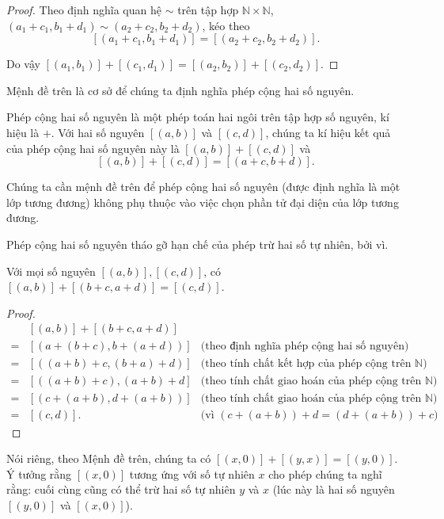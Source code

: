\begin{proof}
    Theo định nghĩa quan hệ $\sim$ trên tập hợp $\mathbb{N}\times\mathbb{N}$, $(a_{1}+c_{1}, b_{1}+d_{1}) \sim (a_{2}+c_{2}, b_{2}+d_{2})$, kéo theo
    \[
        [(a_{1}+c_{1}, b_{1}+d_{1})] = [(a_{2}+c_{2}, b_{2}+d_{2})].
    \]

    Do vậy $[(a_{1}, b_{1})] + [(c_{1}, d_{1})] = [(a_{2}, b_{2})] + [(c_{2}, d_{2})]$.
\end{proof}

Mệnh đề trên là cơ sở để chúng ta định nghĩa phép cộng hai số nguyên.
\begin{definition}
    Phép cộng hai số nguyên là một phép toán hai ngôi trên tập hợp số nguyên, kí hiệu là $+$. Với hai số nguyên $[(a, b)]$ và $[(c, d)]$, chúng ta kí hiệu kết quả của phép cộng hai số nguyên này là $[(a, b)] + [(c, d)]$ và
    \[
        [(a, b)] + [(c, d)] = [(a+c, b+d)].
    \]
\end{definition}

Chúng ta cần mệnh đề trên để phép cộng hai số nguyên (được định nghĩa là một lớp tương đương) không phụ thuộc vào việc chọn phần tử đại diện của lớp tương đương.

Phép cộng hai số nguyên tháo gỡ hạn chế của phép trừ hai số tự nhiên, bởi vì.
\begin{proposition}
    Với mọi số nguyên $[(a, b)], [(c, d)]$, có $[(a, b)] + [(b+c, a+d)] = [(c, d)]$.
\end{proposition}

\begin{proof}
    \begin{align*}
          & [(a, b)] + [(b+c, a+d)]                                                                     \\
        = & [(a+(b+c), b+(a+d))]    & \text{(theo định nghĩa phép cộng hai số nguyên)}                  \\
        = & [((a+b)+c, (b+a)+d)]    & \text{(theo tính chất kết hợp của phép cộng trên $\mathbb{N}$)}   \\
        = & [((a+b)+c), (a+b)+d]    & \text{(theo tính chất giao hoán của phép cộng trên $\mathbb{N}$)} \\
        = & [(c+(a+b), d+(a+b))]    & \text{(theo tính chất giao hoán của phép cộng trên $\mathbb{N}$)} \\
        = & [(c, d)].               & \text{(vì $(c+(a+b))+d = (d+(a+b))+c$)}
    \end{align*}
\end{proof}

Nói riêng, theo Mệnh đề trên, chúng ta có $[(x, 0)] + [(y, x)] = [(y, 0)]$. Ý tưởng rằng $[(x, 0)]$ tương ứng với số tự nhiên $x$ cho phép chúng ta nghĩ rằng: cuối cùng cũng có thể trừ hai số tự nhiên $y$ và $x$ (lúc này là hai số nguyên $[(y, 0)]$ và $[(x, 0)]$).

